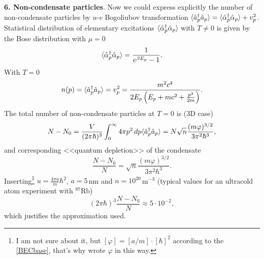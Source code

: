 
\textbf{6. Non-condensate particles}.  Now we could express explicitly the number of non-condensate particles by $u$-$v$ Bogoliubov transformation $\langle \hat{a}^{\dag}_p \hat{a}_p \rangle = \langle \hat{\alpha}_p^{\dag} \hat{\alpha}_p\rangle + v_p^2$. Statistical distribution of elementary excitations $\langle \hat{\alpha}_p^{\dag} \hat{\alpha}_p\rangle$ with $T \neq 0$ is given by the Bose distribution with $\mu=0$
\begin{equation*}
	\langle \hat{\alpha}_p^{\dag} \hat{\alpha}_p\rangle = \frac{1}{e^{\beta E_p}-1}.
\end{equation*}
With $T=0$
\begin{equation*}
	n(p) =  \langle \hat{a}_p^{\dag} \hat{a}_p \rangle = v_p^2 =  \frac{ m^2 c^4}{2 E_p \left(
		E_p + m c^2 + \frac{p^2}{2m}
	\right)}.
\end{equation*}
The total number of non-condensate particles at $T=0$ is (3D case)
\begin{equation*}
	N- N_0 = \frac{V}{(2\pi \hbar)^3} \int_{0}^{\infty}  4 \pi p^2 \, d p  \langle \hat{a}_p^{\dag} \hat{a}_p \rangle = N \sqrt{n} \frac{(m \varphi)^{3/2}}{3 \pi^2 \hbar^3},
\end{equation*}
and  corresponding <<quantum depletion>> of the condensate
\begin{equation*}
	\frac{N-N_0}{N} = \sqrt{n} \frac{(m \varphi)^{3/2}}{3 \pi^2 \hbar^3}.
\end{equation*}
Inserting\footnote{
	I am not sure about it, but $[\varphi]= [a/m] \cdot [\hbar]^2$ according to the \eqref{BECbase}, that's why wrote $\varphi$ in this way.
} $u=\frac{4\pi a}{m} \hbar^2$, $a=5\,$nm and $n = 10^{20}\,$m${}^{-3}$ (typical values for an ultracold atom experiment with ${}^{87}$Rb) 
\begin{equation*}
	(2\pi \hbar)^3 \frac{N-N_0}{N} \approx 5 \cdot 10^{-2},
\end{equation*}
which justifies the approximation used.